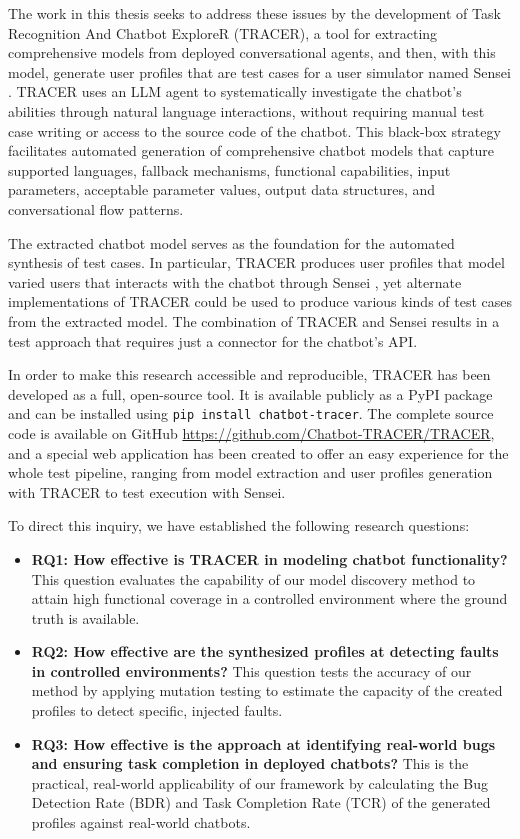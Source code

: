 The work in this thesis seeks to address these issues by the development of Task Recognition And Chatbot ExploreR (\ac{TRACER}), a tool for extracting comprehensive models from deployed conversational agents, and then, with this model, generate user profiles that are test cases for a user simulator named Sensei \autocite{delaraAutomatedEndtoEndTesting2025, delaraSensei}.
\ac{TRACER} uses an \ac{LLM} agent to systematically investigate the chatbot's abilities through natural language interactions, without requiring manual test case writing or access to the source code of the chatbot.
This black-box strategy facilitates automated generation of comprehensive chatbot models that capture supported languages, fallback mechanisms, functional capabilities, input parameters, acceptable parameter values, output data structures, and conversational flow patterns.


The extracted chatbot model serves as the foundation for the automated synthesis of test cases.
In particular, \ac{TRACER} produces user profiles that model varied users that interacts with the chatbot through Sensei \autocite{delaraAutomatedEndtoEndTesting2025, delaraSensei}, yet alternate implementations of \ac{TRACER} could be used to produce various kinds of test cases from the extracted model.
The combination of \ac{TRACER} and Sensei results in a test approach that requires just a connector for the chatbot’s API.

In order to make this research accessible and reproducible, \ac{TRACER} has been developed as a full, open-source tool.
It is available publicly as a \ac{PyPI} package \autocite{sotillodelhornoChatbottracerToolModel} and can be installed using \texttt{pip install chatbot-tracer}.
The complete source code is available on GitHub \url{https://github.com/Chatbot-TRACER/TRACER}, and a special web application has been created to offer an easy experience for the whole test pipeline, ranging from model extraction and user profiles generation with \ac{TRACER} to test execution with Sensei.


To direct this inquiry, we have established the following research questions:
\begin{itemize}
\item \textbf{RQ1: How effective is TRACER in modeling chatbot functionality?}
  This question evaluates the capability of our model discovery method to attain high functional coverage in a controlled environment where the ground truth is available.
\item \textbf{RQ2: How effective are the synthesized profiles at detecting faults in controlled environments?}
  This question tests the accuracy of our method by applying mutation testing \autocite{gomez-abajoMutationTestingTaskOriented2024} to estimate the capacity of the created profiles to detect specific, injected faults.
\item \textbf{RQ3: How effective is the approach at identifying real-world bugs and ensuring task completion in deployed chatbots?}
  This is the practical, real-world applicability of our framework by calculating the Bug Detection Rate (\ac{BDR}) and Task Completion Rate (\ac{TCR}) of the generated profiles against real-world chatbots.
\end{itemize}

